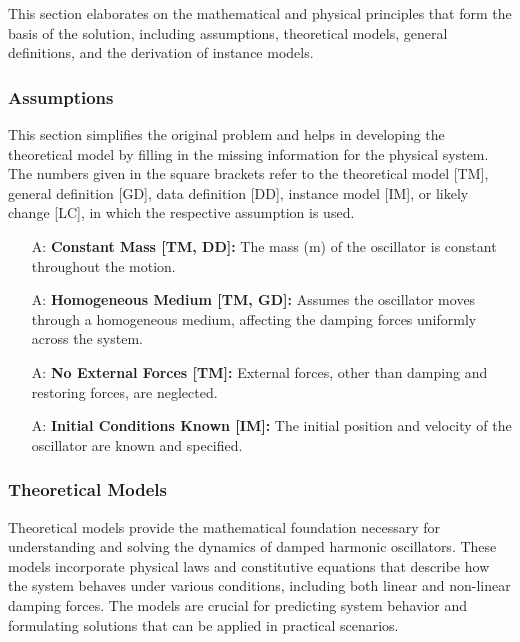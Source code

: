 \documentclass[12pt]{article}
\newcounter{assumpnum} %
\begin{document}
This section elaborates on the mathematical and physical principles that form 
the basis of the solution, including assumptions, theoretical models, general 
definitions, and the derivation of instance models.

\subsubsection{Assumptions} \label{sec_assumpt}

This section simplifies the original problem and helps in developing the
theoretical model by filling in the missing information for the physical system.
The numbers given in the square brackets refer to the theoretical model [TM],
general definition [GD], data definition [DD], instance model [IM], or likely
change [LC], in which the respective assumption is used.

\begin{itemize}
\item[A\refstepcounter{assumpnum}\theassumpnum \label{A_meaningfulLabel}:]
\textbf{Constant Mass [TM, DD]:} The mass (m) of the oscillator is constant throughout the motion.
\item[A\refstepcounter{assumpnum}\theassumpnum \label{A_meaningfulLabel}:]
\textbf{Homogeneous Medium [TM, GD]:} Assumes the oscillator moves through a homogeneous medium, affecting the damping forces uniformly across the system.
\item[A\refstepcounter{assumpnum}\theassumpnum \label{A_meaningfulLabel}:]
\textbf{No External Forces [TM]:} External forces, other than damping and restoring forces, are neglected.
\item[A\refstepcounter{assumpnum}\theassumpnum \label{A_meaningfulLabel}:]
\textbf{Initial Conditions Known [IM]:} The initial position and velocity of the oscillator are known and specified.
\end{itemize}

\subsubsection{Theoretical Models}\label{sec_theoretical}

Theoretical models provide the mathematical foundation necessary for understanding and solving the dynamics of damped harmonic oscillators. These models incorporate physical laws and constitutive equations that describe how the system behaves under various conditions, including both linear and non-linear damping forces. The models are crucial for predicting system behavior and formulating solutions that can be applied in practical scenarios.
\end{document}
